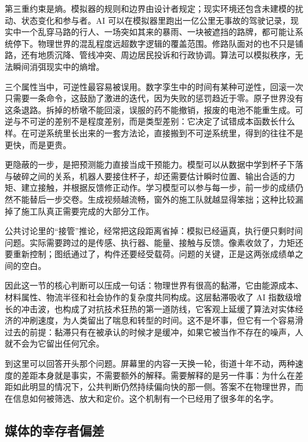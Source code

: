 第三重约束是熵。模拟器的规则和边界由设计者规定；现实环境还包含未建模的扰动、状态变化和参与者。AI 可以在模拟器里跑出一亿公里无事故的驾驶记录，现实中一个乱穿马路的行人、一场突如其来的暴雨、一块被遮挡的路牌，都可能让系统停下。物理世界的混乱程度远超数字逻辑的覆盖范围。修路队面对的也不只是铺路，还有地质沉降、管线冲突、周边居民投诉和行政协调。算法可以模拟秩序，无法瞬间消弭现实中的熵增。


三个属性当中，可逆性最容易被误用。数字孪生中的时间有某种可逆性，回滚一次只需要一条命令，这鼓励了激进的迭代，因为失败的惩罚趋近于零。原子世界没有这条退路。拆掉的桥墩不能回滚，误服的药不能撤销，报废的电池不能重生成。可逆与不可逆的差别不是程度差别，而是类型差别：它决定了试错成本函数长什么样。在可逆系统里长出来的一套方法论，直接搬到不可逆系统里，得到的往往不是更快，而是更贵。

更隐蔽的一步，是把预测能力直接当成干预能力。模型可以从数据中学到杯子下落与破碎之间的关系，机器人要接住杯子，却还需要估计瞬时位置、输出合适的力矩、建立接触，并根据反馈修正动作。学习模型可以参与每一步，前一步的成绩仍然不能替后一步交卷。生成视频越流畅，窗外的施工队就越显得笨拙；这种比较漏掉了施工队真正需要完成的大部分工作。

公共讨论里的“接管”推论，经常把这段距离省掉：模拟已经逼真，执行便只剩时间问题。实际需要跨过的是传感、执行器、能量、接触与反馈。像素收敛了，力矩还要重新控制；图纸通过了，构件还要经受载荷。问题的关键，正是这两张成绩单之间的空白。

因此这一节的核心判断可以压成一句话：物理世界有很高的黏滞，它由能源成本、材料属性、物流半径和社会协作的复杂度共同构成。这层黏滞吸收了 AI 指数级增长的冲击波，也构成了对抗技术狂热的第一道防线，它客观上延缓了算法对实体经济的冲刷速度，为人类留出了喘息和转型的时间。这不是坏事，但它有一个容易滑过去的前提：黏滞只有在被承认的时候才是缓冲，如果它被当作不存在的噪声，人就不会为它留出任何冗余。

到这里可以回答开头那个问题。屏幕里的内容一天换一轮，街道十年不动，两种速度的差距本身就是事实，不需要额外的解释。需要解释的是另一件事：为什么在差距如此明显的情况下，公共判断仍然持续偏向快的那一侧。答案不在物理世界，而在信息如何被筛选、放大和定价。这个机制有一个已经用了很多年的名字。

\subsection{媒体的幸存者偏差}


